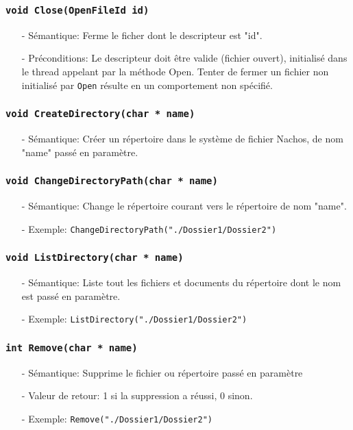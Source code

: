 \documentclass[11pt]{article}
\theoremstyle{definition}
\theoremstyle{definition}
\begin{document}
\subsubsection{\texttt{void Close(OpenFileId id)}}
\begin{itemize}
\item[-]Sémantique: Ferme le ficher dont le descripteur est "id".
\item[-]Préconditions: Le descripteur doit être valide (fichier ouvert), initialisé dans le thread appelant
  par la méthode Open. Tenter de fermer un fichier non initialisé par \texttt{Open} résulte en un comportement non spécifié.
\end{itemize}

\subsubsection{\texttt{void CreateDirectory(char * name)}}
\begin{itemize}
\item[-]Sémantique: Créer un répertoire dans le système de fichier Nachos, de nom "name"
  passé en paramètre.
\end{itemize}

\subsubsection{\texttt{void ChangeDirectoryPath(char * name)}}
\begin{itemize}
\item[-]Sémantique: Change le répertoire courant vers le répertoire de nom "name".
\item[-]Exemple: \texttt{ChangeDirectoryPath("./Dossier1/Dossier2")}
\end{itemize}

\subsubsection{\texttt{void ListDirectory(char * name)}}
\begin{itemize}
\item[-]Sémantique: Liste tout les fichiers et documents du répertoire dont le nom est passé en paramètre.
\item[-]Exemple: \texttt{ListDirectory("./Dossier1/Dossier2")}
\end{itemize}

 \subsubsection{\texttt{int Remove(char * name)}}
\begin{itemize}
\item[-]Sémantique: Supprime le fichier ou répertoire passé en paramètre
\item[-]Valeur de retour: 1 si la suppression a réussi, 0 sinon.
\item[-]Exemple: \texttt{Remove("./Dossier1/Dossier2")}
\end{itemize}
\end{document}
